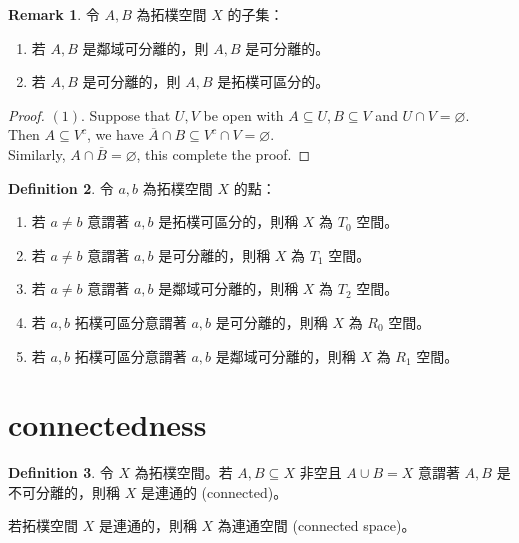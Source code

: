 \documentclass[12pt]{article}
\theoremstyle{definition}
\newtheorem{definition}{Definition}[section]
\newtheorem{remark}[definition]{Remark}
\newcommand\<{\langle}
\renewcommand\>{\rangle}
\begin{document}
\begin{CJK}{UTF8}{bsmi}
\begin{remark}
\label{relation between separation axiom}
    令 $A, B$ 為拓樸空間 $X$ 的子集：
    \begin{enumerate}
        \item 若 $A, B$ 是鄰域可分離的，則 $A, B$ 是可分離的。
        \item 若 $A, B$ 是可分離的，則 $A, B$ 是拓樸可區分的。
    \end{enumerate}
\end{remark}
\begin{proof}
    $(1)$. Suppose that $U, V$ be open with $A\subseteq U, B\subseteq V$ and $U\cap V=\varnothing$. \\
    Then $A\subseteq V^c$, we have $\overline{A}\cap B\subseteq V^c\cap V=\varnothing$. \\
    Similarly, $A\cap\overline{B}=\varnothing$, this complete the proof.
\end{proof}

\begin{definition}
    令 $a, b$ 為拓樸空間 $X$ 的點：
    \begin{enumerate}
        \item 若 $a\ne b$ 意謂著 $a, b$ 是拓樸可區分的，則稱 $X$ 為 $T_0$ 空間。
        \item 若 $a\ne b$ 意謂著 $a, b$ 是可分離的，則稱 $X$ 為 $T_1$ 空間。
        \item 若 $a\ne b$ 意謂著 $a, b$ 是鄰域可分離的，則稱 $X$ 為 $T_2$ 空間。
        \item 若 $a, b$ 拓樸可區分意謂著 $a, b$ 是可分離的，則稱 $X$ 為 $R_0$ 空間。
        \item 若 $a, b$ 拓樸可區分意謂著 $a, b$ 是鄰域可分離的，則稱 $X$ 為 $R_1$ 空間。
    \end{enumerate}
\end{definition}

\section{connectedness}

\begin{definition}
    令 $X$ 為拓樸空間。若 $A, B\subseteq X$ 非空且 $A\cup B=X$ 意謂著 $A, B$ 是不可分離的，則稱 $X$ 是連通的 (connected)。
\end{definition}

若拓樸空間 $X$ 是連通的，則稱 $X$ 為連通空間 (connected space)。


\end{CJK}
\end{document}
